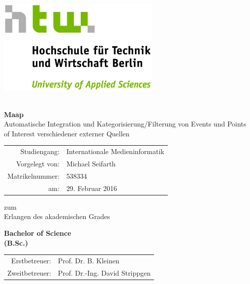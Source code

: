 \titlepage

\begin{center}
\includegraphics[width=8cm]{images/HTW_Logo_rgb.jpg}\vspace{0.5cm}
\par\end{center}

\noindent \begin{center}
\textsf{}\\
\textsf{\textbf{\huge Maap}}\\
\textsf{\large Automatische Integration und Kategorisierung/Filterung von Events und Points of Interest verschiedener externer Quellen}
\par\end{center}{\Large \par}

\vspace{2cm}


\noindent \begin{center}
{\huge }\begin{tabular}{rl}
Studiengang: & Internationale Medieninformatik\tabularnewline
Vorgelegt von: & Michael Seifarth\tabularnewline
Matrikelnummer: & 538334\tabularnewline
am: & 29. Februar 2016\tabularnewline
\end{tabular}
\par\end{center}{\huge \par}

\vspace{1cm}


\noindent \begin{center}
zum \\
Erlangen des akademischen Grades\textsf{}\\
\textsf{\smallskip{}
}
\par\end{center}

\noindent \begin{center}
\textsf{\textbf{\huge Bachelor of Science}}\textsf{\textbf{\LARGE }}\\
\textsf{\textbf{(B.Sc.)}}
\par\end{center}

\noindent \begin{center}
\medskip{}
\begin{tabular}{rl}
Erstbetreuer: & Prof. Dr. B. Kleinen\tabularnewline
Zweitbetreuer: & Prof. Dr.-Ing. David Strippgen\tabularnewline
\end{tabular}
\par\end{center}

\newpage{}
